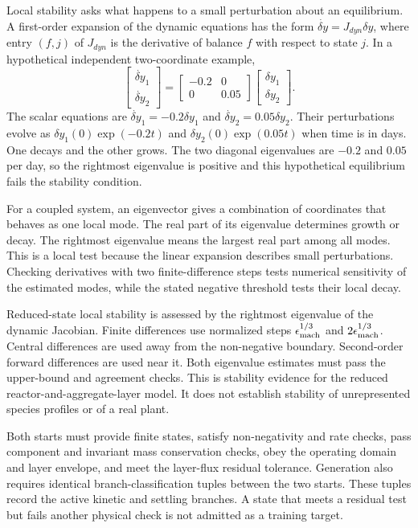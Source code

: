 Local stability asks what happens to a small perturbation about an equilibrium. A first-order expansion of the dynamic equations has the form $\dot{\delta y}=J_{dyn}\delta y$, where entry $(f,j)$ of $J_{dyn}$ is the derivative of balance $f$ with respect to state $j$. In a hypothetical independent two-coordinate example,
\[
\begin{bmatrix}\dot{\delta y}_1\\\dot{\delta y}_2\end{bmatrix}
=\begin{bmatrix}-0.2&0\\0&0.05\end{bmatrix}
\begin{bmatrix}\delta y_1\\\delta y_2\end{bmatrix}.
\]
The scalar equations are $\dot{\delta y}_1=-0.2\delta y_1$ and $\dot{\delta y}_2=0.05\delta y_2$. Their perturbations evolve as $\delta y_1(0)\exp(-0.2t)$ and $\delta y_2(0)\exp(0.05t)$ when time is in days. One decays and the other grows. The two diagonal eigenvalues are $-0.2$ and $0.05$ per day, so the rightmost eigenvalue is positive and this hypothetical equilibrium fails the stability condition.

For a coupled system, an eigenvector gives a combination of coordinates that behaves as one local mode. The real part of its eigenvalue determines growth or decay. The rightmost eigenvalue means the largest real part among all modes. This is a local test because the linear expansion describes small perturbations. Checking derivatives with two finite-difference steps tests numerical sensitivity of the estimated modes, while the stated negative threshold tests their local decay.

Reduced-state local stability is assessed by the rightmost eigenvalue of the dynamic Jacobian. Finite differences use normalized steps $\epsilon_{\rm mach}^{1/3}$ and $2\epsilon_{\rm mach}^{1/3}$. Central differences are used away from the non-negative boundary. Second-order forward differences are used near it. Both eigenvalue estimates must pass the upper-bound and agreement checks. This is stability evidence for the reduced reactor-and-aggregate-layer model. It does not establish stability of unrepresented species profiles or of a real plant.

Both starts must provide finite states, satisfy non-negativity and rate checks, pass component and invariant mass conservation checks, obey the operating domain and layer envelope, and meet the layer-flux residual tolerance. Generation also requires identical branch-classification tuples between the two starts. These tuples record the active kinetic and settling branches. A state that meets a residual test but fails another physical check is not admitted as a training target.

